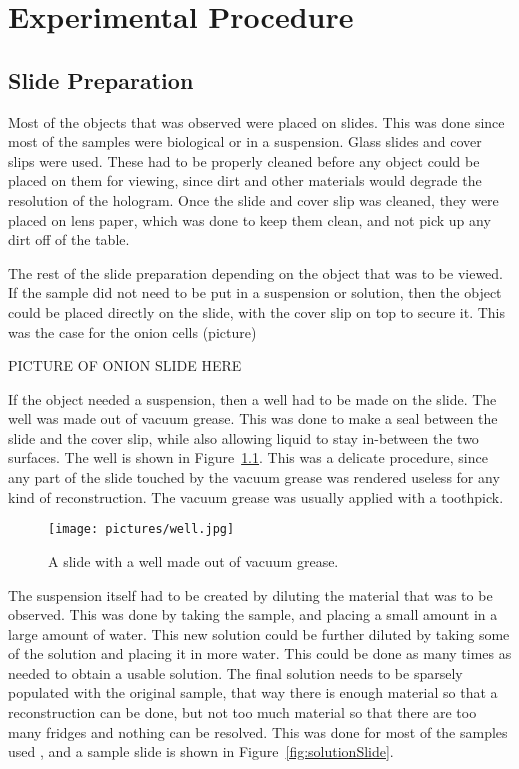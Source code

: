 



\chapter{Experimental Procedure} \label{chap:Experimental}

\section{Slide Preparation}

Most of the objects that was observed were placed on slides. This was done
since most of the samples were biological or in a suspension. Glass slides and
cover slips were used. These had to be properly cleaned before any object could
be placed on them for viewing, since dirt and other materials would degrade the
resolution of the hologram. Once the slide and cover slip was cleaned, they
were placed on lens paper, which was done to keep them clean, and not pick up
any dirt off of the table.

The rest of the slide preparation depending on the object that was to be
viewed. If the sample did not need to be put in a suspension or solution, then
the object could be placed directly on the slide, with the cover slip on top to
secure it. This was the case for the onion cells (picture)

PICTURE OF ONION SLIDE HERE

If the object needed a suspension, then a well had to be made on the slide. The
well was made out of vacuum grease. This was done to make a seal between the
slide and the cover slip, while also allowing liquid to stay in-between the two
surfaces.
The well is shown in Figure~\ref{fig:well}.
This was a delicate procedure, since any part of the slide touched by the
vacuum grease was rendered useless for any kind of reconstruction. The vacuum
grease was usually applied with a toothpick.

\begin{figure}[htbp!]
\begin{center}
    \texttt{[image: pictures/well.jpg]}
\end{center}
\caption{A slide with a well made out of vacuum grease.}
\label{fig:well}
\end{figure}

The suspension itself had to be created by diluting the material that was to be
observed. This was done by taking the sample, and placing a small amount in a
large amount of water. This new solution could be further diluted by taking
some of the solution and placing it in more water. This could be done as many
times as needed to obtain a usable solution. The final solution needs to be
sparsely populated with the original sample, that way there is enough material
so that a reconstruction can be done, but not too much material so that there
are too many fridges and nothing can be resolved. This was done for most of the
samples used%
, and a sample slide is shown in Figure~\ref{fig:solutionSlide}.

